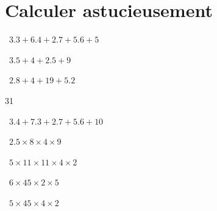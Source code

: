 
\section{Calculer astucieusement}

\begin{questions}
	
	\question[2]  $\num{3.3} + \num{6.4} + \num{2.7} + \num{5.6} + 5 $
	\fillwithdottedlines{2cm}
	\begin{solution}
		
	\end{solution}


	 
	
	\question[2]  $\num{3.5} + 4 + \num{2.5} + 9$
	\fillwithdottedlines{2cm}
	\begin{solution}
		
	\end{solution}
	
	
	\question[2]  $\num{2.8} + 4 + 19 + \num{5.2}$
	\fillwithdottedlines{2cm}
	\begin{solution}
		31
	\end{solution}
	
	\question[2]  $\num{3.4} + \num{7.3} + \num{2.7} + \num{5.6} + 10 $
	\fillwithdottedlines{2cm}
	\begin{solution}
		
	\end{solution}
	
	
	
	
	\question[2]  $\num{2.5} \times 8 \times 4 \times 9$
	\fillwithdottedlines{2cm}
	\begin{solution}
		
	\end{solution}
	
	
	
	
	\question[2]  $\num{5} \times 11 \times 11 \times \num{4} \times 2$
	\fillwithdottedlines{2cm}
	\begin{solution}
		
	\end{solution}
	
	
	\question[2]  $\num{6} \times 45 \times 2 \times \num{5} $
	\fillwithdottedlines{2cm}
	\begin{solution}
		
	\end{solution}

	\question[2]  $\num{5} \times 45  \times \num{4} \times 2$
	\fillwithdottedlines{2cm}
	\begin{solution}
		

\end{solution}
\end{questions}
